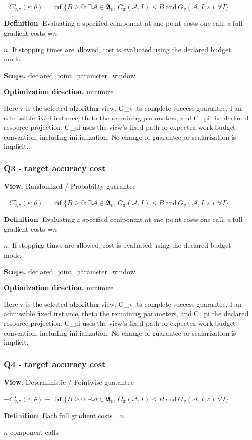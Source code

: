 \documentclass[10pt,a4paper]{article}
\newcommand{\AtlasMath}[1]{\par\begingroup\centering\setbox0=\hbox{$\displaystyle #1$}\ifdim\wd0>1.4\linewidth\typeout{ATLAS WIDE FORMULA: \the\wd0}\fi\ifdim\wd0>\linewidth\resizebox{\linewidth}{!}{\box0}\else\box0\fi\par\endgroup}
\newcommand{\AtlasInlineMath}[1]{\begingroup\setbox0=\hbox{$#1$}\ifdim\wd0>.4\linewidth\endgroup\AtlasMath{#1}\else\endgroup$#1$\fi}
\begin{document}
\AtlasMath{C^\star_{v,\pi}(\varepsilon;\theta)=\inf\{B\ge0:\exists\mathcal A\in\mathfrak A_v,\ C_\pi(\mathcal A,I)\le B\ \text{and}\ G_v(\mathcal A,I;\varepsilon)\ \forall I\}}
\textbf{Definition.} Evaluating a specified component at one point costs one call; a full gradient costs \AtlasInlineMath{n}. If stopping times are allowed, cost is evaluated using the declared budget mode.

\textbf{Scope.} declared\_joint\_parameter\_window

\textbf{Optimization direction.} minimize

Here v is the selected algorithm view, G\_v its complete success guarantee, I an admissible fixed instance, theta the remaining parameters, and C\_pi the declared resource projection. C\_pi uses the view's fixed-path or expected-work budget convention, including initialization. No change of guarantee or scalarization is implicit.

\subsubsection{Q3 - target accuracy cost}
\textbf{View.} Randomized / Probability guarantee

\AtlasMath{C^\star_{v,\pi}(\varepsilon;\theta)=\inf\{B\ge0:\exists\mathcal A\in\mathfrak A_v,\ C_\pi(\mathcal A,I)\le B\ \text{and}\ G_v(\mathcal A,I;\varepsilon)\ \forall I\}}
\textbf{Definition.} Evaluating a specified component at one point costs one call; a full gradient costs \AtlasInlineMath{n}. If stopping times are allowed, cost is evaluated using the declared budget mode.

\textbf{Scope.} declared\_joint\_parameter\_window

\textbf{Optimization direction.} minimize

Here v is the selected algorithm view, G\_v its complete success guarantee, I an admissible fixed instance, theta the remaining parameters, and C\_pi the declared resource projection. C\_pi uses the view's fixed-path or expected-work budget convention, including initialization. No change of guarantee or scalarization is implicit.

\subsubsection{Q4 - target accuracy cost}
\textbf{View.} Deterministic / Pointwise guarantee

\AtlasMath{C^\star_{v,\pi}(\varepsilon;\theta)=\inf\{B\ge0:\exists\mathcal A\in\mathfrak A_v,\ C_\pi(\mathcal A,I)\le B\ \text{and}\ G_v(\mathcal A,I;\varepsilon)\ \forall I\}}
\textbf{Definition.} Each full gradient costs \AtlasInlineMath{n} component calls.
\end{document}
